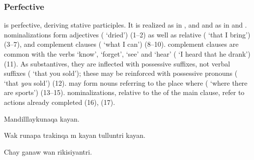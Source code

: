 {\subsubsection{Perfective }
 is perfective, deriving stative participles. It is realized as  in \ACH{}, \AMV{} and \SP{} and as  in \LT{} and \CH{}.  nominalizations form adjectives ( `dried') (1--2) as well as relative ( `that I bring') (3--7), and complement clauses ( `what I can') (8--10).  complement clauses are common with the verbs  `know',  `forget',  `see' and  `hear' (  `I heard that he drank') (11). As substantives, they are inflected with possessive suffixes, not verbal suffixes (  `that you sold'); these may be reinforced with possessive pronouns (  `that \emph{you} sold') (12).  may form nouns referring to the place where  ( `where there are sports') (13--15).  nominalizations, relative to the  of the main clause, refer to actions already completed (16), (17).

%
{Mandilllaykunaqa  kayan.}%
{}%
{}{}%

%
{Wak runapa trakinqa m kayan tulluntri  kayan.}%
{}%
{}{}%

%
{Chay ganaw wan rikisiyantri.}%
{}%
{}{}%

}
